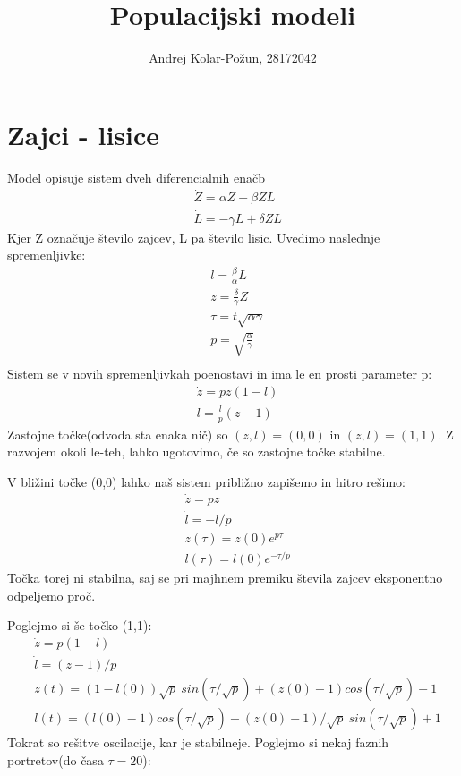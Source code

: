 \documentclass{article}
\title{Populacijski modeli}
\author{Andrej Kolar-Požun, 28172042}
\begin{document}
\maketitle
\newpage
{}
\section{Zajci - lisice}

Model opisuje sistem dveh diferencialnih enačb
\begin{align*}
&\dot{Z} = \alpha Z - \beta Z L \\
&\dot{L} = -\gamma L + \delta Z L
\end{align*}
Kjer Z označuje število zajcev, L pa število lisic.
Uvedimo naslednje spremenljivke:
\begin{align*}
&l = \frac{\beta}{\alpha} L\\
&z = \frac{\delta}{\gamma} Z\\
&\tau = t \sqrt{\alpha \gamma}\\
&p = \sqrt{\frac{\alpha}{\gamma}} \\
\end{align*}
Sistem se v novih spremenljivkah poenostavi in ima le en prosti parameter p:
\begin{align*}
&\dot{z} = pz(1-l) \\
&\dot{l} = \frac{l}{p}(z-1)
\end{align*}
Zastojne točke(odvoda sta enaka nič) so $(z,l) = (0,0)$ in $(z,l)=(1,1)$.
Z razvojem okoli le-teh, lahko ugotovimo, če so zastojne točke stabilne.

V bližini točke (0,0) lahko naš sistem približno zapišemo in hitro rešimo:
\begin{align*}
&\dot{z} = pz \\
&\dot{l} = -l/p \\
&z(\tau) = z(0)e^{p \tau} \\
&l(\tau) = l(0)e^{-\tau/p}
\end{align*}
Točka torej ni stabilna, saj se pri majhnem premiku števila zajcev eksponentno odpeljemo proč.

Poglejmo si še točko (1,1):
\begin{align*}
&\dot{z} = p(1-l) \\
&\dot{l} = (z-1)/p \\
&z(t) = (1-l(0))\sqrt{p}\  sin(\tau/\sqrt{p}) + (z(0)-1) cos(\tau/\sqrt{p}) + 1 \\
&l(t) = (l(0)-1)cos(\tau/\sqrt{p}) + (z(0)-1)/\sqrt{p}\  sin(\tau/\sqrt{p}) + 1
\end{align*}
Tokrat so rešitve oscilacije, kar je stabilneje.
\newpage
Poglejmo si nekaj faznih portretov(do časa $\tau = 20$):
\end{document}
